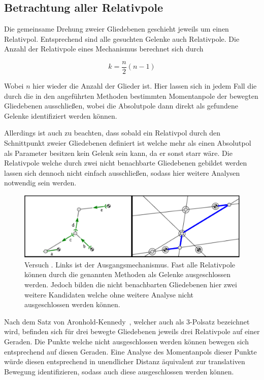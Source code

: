 \subsection{Betrachtung aller Relativpole}

Die gemeinsame Drehung zweier Gliedebenen geschieht jeweils um einen Relativpol.
Entsprechend sind alle gesuchten Gelenke auch Relativpole.
Die Anzahl der Relativpole eines Mechanismus berechnet sich durch~\cite{Goessner2016}

\begin{equation}
    k = \frac{n}{2}(n-1)
    \label{eq:anzahl_pole}
\end{equation}

Wobei $n$ hier wieder die Anzahl der Glieder ist.
Hier lassen sich in jedem Fall die durch die in den angeführten Methoden bestimmten Momentanpole der bewegten Gliedebenen ausschlie{\ss}en, wobei die Absolutpole dann direkt als gefundene Gelenke identifiziert werden können.

Allerdings ist auch zu beachten, dass sobald ein Relativpol durch den Schnittpunkt zweier Gliedebenen definiert ist welche mehr als einen Absolutpol als Parameter besitzen kein Gelenk sein kann, da er sonst starr wäre.
Die Relativpole welche durch zwei nicht benachbarte Gliedebenen gebildet werden lassen sich dennoch nicht einfach ausschlie{\ss}en, sodass hier weitere Analysen notwendig sein werden.

\begin{figure}
    \includegraphics[width=\textwidth]{gfx/gruppe4_3_edit.png}
    \caption[Versuch ]{Versuch . Links ist der Ausgangsmechanismus. Fast alle Relativpole können durch die genannten Methoden als Gelenke ausgeschlossen werden. Jedoch bilden die nicht benachbarten Gliedebenen hier zwei weitere Kandidaten welche ohne weitere Analyse nicht ausgeschlossen werden können.}
    \label{fig:gruppe4_3}
\end{figure}

Nach dem Satz von Aronhold-Kennedy~\cite{Goessner2016, Kerle2016}, welcher auch als 3-Polsatz bezeichnet wird, befinden sich für drei bewegte Gliedebenen jeweils drei Relativpole auf einer Geraden.
Die Punkte welche nicht ausgeschlossen werden können bewegen sich entsprechend auf diesen Geraden.
Eine Analyse des Momentanpols dieser Punkte würde diesen entsprechend in unendlicher Distanz äquivalent zur translativen Bewegung identifizieren, sodass auch diese ausgeschlossen werden können.

